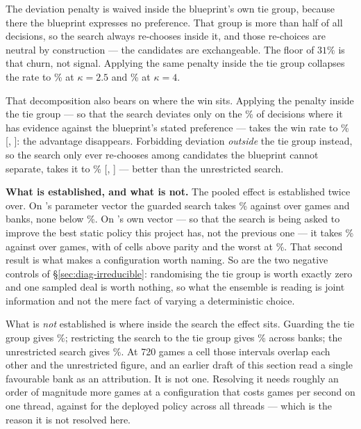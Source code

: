 The deviation penalty is waived inside the blueprint's own tie group, because there the blueprint
expresses no preference. That group is more than half of all decisions, so the search always
re-chooses inside it, and those re-choices are neutral by construction --- the candidates are
exchangeable. The floor of $31\%$ is that churn, not signal. Applying the same penalty inside the
tie group collapses the rate to \vsixSearchDevGuardedTwoFive\% at $\kappa = 2.5$ and
\vsixSearchDevGuardedFour\% at $\kappa = 4$.

That decomposition also bears on where the win sits. Applying the penalty inside the tie group --- so that the search deviates only on the
\vsixSearchDevGuardedTwoFive\% of decisions where it has evidence against the blueprint's stated
preference --- takes the win rate to \vsixSearchTieGuardedWin\%
[\vsixSearchTieGuardedLo, \vsixSearchTieGuardedHi]: the advantage disappears. Forbidding deviation
\emph{outside} the tie group instead, so the search only ever re-chooses among candidates the
blueprint cannot separate, takes it to \vsixSearchTieOnlyTwelve\%
[\vsixSearchTieOnlyTwelveLo, \vsixSearchTieOnlyTwelveHi] --- better than the unrestricted search.

\textbf{What is established, and what is not.} The pooled effect is established twice over. On
\vfive{}'s parameter vector the guarded search takes \vsixSearchPooled\% against \vfive{} over
\vsixSearchPooledN{} games and \vsixSearchPooledBanks{} banks, none below
\vsixSearchPooledMin\%. On \vsix{}'s own vector --- so that the search is being asked to improve
the best static policy this project has, not the previous one --- it takes \vsixSearchLift\%
against \vsix{} over \vsixSearchLiftN{} games, with \vsixSearchLiftAbove{} of
\vsixSearchLiftCells{} cells above parity and the worst at \vsixSearchLiftMin\%. That second
result is what makes \vsixsearch{} a configuration worth naming. So are the two negative
controls of \S\ref{sec:diag-irreducible}: randomising the tie group is worth exactly zero and one
sampled deal is worth nothing, so what the ensemble is reading is joint information and not the
mere fact of varying a deterministic choice.

What is \emph{not} established is where inside the search the effect sits. Guarding the tie group
gives \vsixSearchTieGuardedWin\%; restricting the search to the tie group gives
\vsixTieSearchBankList\% across \vsixTieSearchBanks{} banks; the unrestricted search gives
\vsixSearchPooled\%. At 720 games a cell those intervals overlap each other and the unrestricted
figure, and an earlier draft of this section read a single favourable bank as an attribution. It is
not one. Resolving it needs roughly an order of magnitude more games at a configuration that costs
\vsixSearchGps{} games per second on one thread, against \vsixThroughputSix{} for the deployed
policy across all threads --- which is the reason it is not resolved here.

